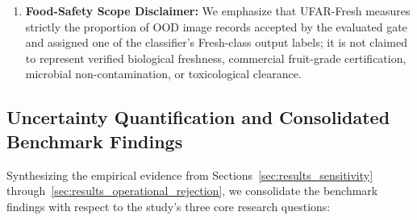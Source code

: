 \begin{enumerate}
\item \textbf{Food-Safety Scope Disclaimer:} We emphasize that UFAR-Fresh measures strictly the proportion of OOD image records accepted by the evaluated gate and assigned one of the classifier's Fresh-class output labels; it is not claimed to represent verified biological freshness, commercial fruit-grade certification, microbial non-contamination, or toxicological clearance.
\end{enumerate}

\vspace*{-4pt}\subsection{Uncertainty Quantification and Consolidated Benchmark Findings}
\label{sec:results_consolidated_findings}

Synthesizing the empirical evidence from Sections~\ref{sec:results_sensitivity} through~\ref{sec:results_operational_rejection}, we consolidate the benchmark findings with respect to the study's three core research questions:

